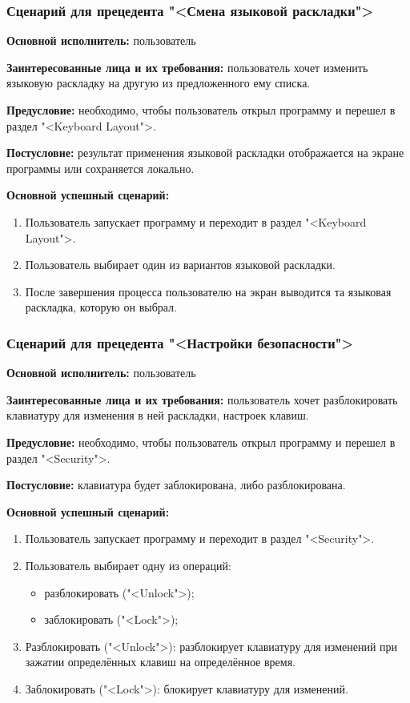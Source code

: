 \subsubsection{Сценарий для прецедента "<Смена языковой раскладки">}

\textbf{Основной исполнитель:} пользователь

\textbf{Заинтересованные лица и их требования:} пользователь хочет изменить языковую раскладку на другую из предложенного ему списка.

\textbf{Предусловие:} необходимо, чтобы пользователь открыл программу и перешел в раздел "<Keyboard Layout">.

\textbf{Постусловие:} результат применения языковой раскладки отображается на экране программы или сохраняется локально.

\textbf{Основной успешный сценарий:}

\begin{enumerate}
\item Пользователь запускает программу и переходит в раздел "<Keyboard Layout">.
\item Пользователь выбирает один из вариантов языковой раскладки.
\item После завершения процесса пользователю на экран выводится та языковая раскладка, которую он выбрал.
\end{enumerate}

\subsubsection{Сценарий для прецедента "<Настройки безопасности">}

\textbf{Основной исполнитель:} пользователь

\textbf{Заинтересованные лица и их требования:} пользователь хочет разблокировать клавиатуру для изменения в ней раскладки, настроек клавиш.

\textbf{Предусловие:} необходимо, чтобы пользователь открыл программу и перешел в раздел "<Security">.

\textbf{Постусловие:} клавиатура будет заблокирована, либо разблокирована.

\textbf{Основной успешный сценарий:}

\begin{enumerate}
\item Пользователь запускает программу и переходит в раздел "<Security">.
\item Пользователь выбирает одну из операций:

\begin{itemize}
	\item разблокировать ("<Unlock">);
	\item заблокировать ("<Lock">);
\end{itemize}

\item[3.1.] Разблокировать ("<Unlock">): разблокирует клавиатуру для изменений при зажатии определённых клавиш на определённое время.
\item[3.2.] Заблокировать ("<Lock">): блокирует клавиатуру для изменений.
\end{enumerate}


